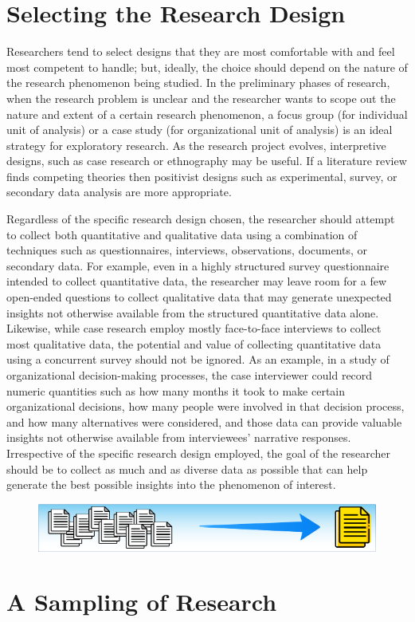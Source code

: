 \section{Selecting the Research Design}

Researchers tend to select designs that they are most comfortable with and feel most competent to handle; but, ideally, the choice should depend on the nature of the research phenomenon being studied. In the preliminary phases of research, when the research problem is unclear and the researcher wants to scope out the nature and extent of a certain research phenomenon, a focus group (for individual unit of analysis) or a case study (for organizational unit of analysis) is an ideal strategy for exploratory research. As the research project evolves, interpretive designs, such as case research or ethnography may be useful. If a literature review finds competing theories then positivist designs such as experimental, survey, or secondary data analysis are more appropriate.

Regardless of the specific research design chosen, the researcher should attempt to collect both quantitative and qualitative data using a combination of techniques such as questionnaires, interviews, observations, documents, or secondary data. For example, even in a highly structured survey questionnaire intended to collect quantitative data, the researcher may leave room for a few open-ended questions to collect qualitative data that may generate unexpected insights not otherwise available from the structured quantitative data alone. Likewise, while case research employ mostly face-to-face interviews to collect most qualitative data, the potential and value of collecting quantitative data using a concurrent survey should not be ignored. As an example, in a study of organizational decision-making processes, the case interviewer could record numeric quantities such as how many months it took to make certain organizational decisions, how many people were involved in that decision process, and how many alternatives were considered, and those data can provide valuable insights not otherwise available from interviewees' narrative responses. Irrespective of the specific research design employed, the goal of the researcher should be to collect as much and as diverse data as possible that can help generate the best possible insights into the phenomenon of interest.

\noindent\begin{minipage}{\textwidth}
	\begin{figure}[H]
		\centering
		\includegraphics[width=.85\linewidth]{gfx/Sampling_Of_Research}
		\caption*{}
		\label{01:sampling_of_research}
	\end{figure}
	\vspace{-10.0ex} %
	\section{A Sampling of Research}
\end{minipage}
